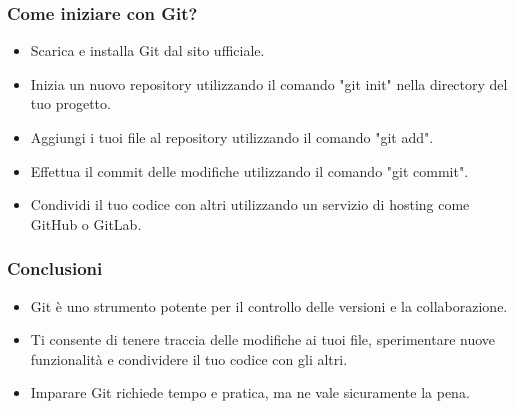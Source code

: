 \documentclass{beamer}
\begin{document}
\begin{frame}
\frametitle{Come iniziare con Git?}
\begin{itemize}
\item Scarica e installa Git dal sito ufficiale.
\item Inizia un nuovo repository utilizzando il comando "git init" nella directory del tuo progetto.
\item Aggiungi i tuoi file al repository utilizzando il comando "git add".
\item Effettua il commit delle modifiche utilizzando il comando "git commit".
\item Condividi il tuo codice con altri utilizzando un servizio di hosting come GitHub o GitLab.
\end{itemize}
\end{frame}

\begin{frame}
\frametitle{Conclusioni}
\begin{itemize}
\item Git è uno strumento potente per il controllo delle versioni e la collaborazione.
\item Ti consente di tenere traccia delle modifiche ai tuoi file, sperimentare nuove funzionalità e condividere il tuo codice con gli altri.
\item Imparare Git richiede tempo e pratica, ma ne vale sicuramente la pena.
\end{itemize}
\end{frame}
\end{document}
